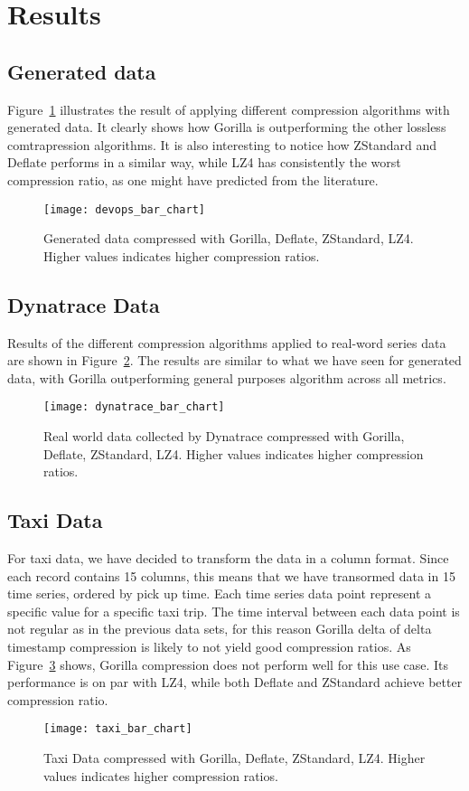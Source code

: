 \section{Results}
\subsection{Generated data}
Figure~\ref{devops_lossless_compression} illustrates the result of applying different compression algorithms
with generated data. It clearly shows how Gorilla is outperforming the other lossless comtrapression algorithms.
It is also interesting to notice how ZStandard and Deflate performs in a similar way, while LZ4 has
consistently the worst compression ratio, as one might have predicted from the literature.

\begin{figure}[!htbp]
\begin{center}
\texttt{[image: devops\_bar\_chart]}
\caption[compression]{Generated data compressed with Gorilla, Deflate, ZStandard, LZ4.
Higher values indicates higher compression ratios.}
\label{devops_lossless_compression}
\end{center}
\end{figure}

\subsection{Dynatrace Data}
Results of the different compression algorithms applied to real-word series data are shown in
Figure~\ref{dynatrace_compression}. The results are similar to what we have seen for generated data,
with Gorilla outperforming general purposes algorithm across all metrics.

\begin{figure}[!htbp]
\begin{center}
\texttt{[image: dynatrace\_bar\_chart]}
\caption[compression]{Real world data collected by Dynatrace compressed with Gorilla, Deflate, ZStandard, LZ4.
Higher values indicates higher compression ratios.}
\label{dynatrace_compression}
\end{center}
\end{figure}

\subsection{Taxi Data}
For taxi data, we have decided to transform the data in a column format.
Since each record contains 15 columns, this means that we have transormed data in 15 time series,
ordered by pick up time.
Each time series data point represent a specific value for a specific taxi trip.
The time interval between each data point is not regular as in the previous data sets, for this
reason Gorilla delta of delta timestamp compression is likely to not yield good compression
ratios.
As Figure~\ref{taxi_bar_chart} shows, Gorilla compression does not perform well for this use case.
Its performance is on par with LZ4, while both Deflate and ZStandard achieve better compression ratio.

\begin{figure}[!htbp]
\begin{center}
\texttt{[image: taxi\_bar\_chart]}
\caption[compression]{Taxi Data compressed with Gorilla, Deflate, ZStandard, LZ4.
Higher values indicates higher compression ratios.}
\label{taxi_bar_chart}
\end{center}
\end{figure}